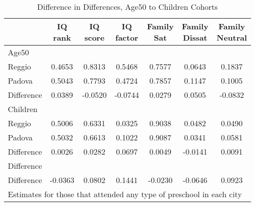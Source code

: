 \begin{table}[htbp]\centering
\caption{Difference in Differences, Age50 to Children Cohorts}
\begin{tabular}{l*{6}{c}}
\hline\hline
            &     IQ rank&    IQ score&   IQ factor&  Family Sat&Family Dissat&Family Neutral\\
\hline
Age50       &            &            &            &            &            &            \\
Reggio      &      0.4653&      0.8313&      0.5468&      0.7577&      0.0643&      0.1837\\
Padova      &      0.5043&      0.7793&      0.4724&      0.7857&      0.1147&      0.1005\\
Difference  &      0.0389&     -0.0520&     -0.0744&      0.0279&      0.0505&     -0.0832\\
\hline
Children    &            &            &            &            &            &            \\
Reggio      &      0.5006&      0.6331&      0.0325&      0.9038&      0.0482&      0.0490\\
Padova      &      0.5032&      0.6613&      0.1022&      0.9087&      0.0341&      0.0581\\
Difference  &      0.0026&      0.0282&      0.0697&      0.0049&     -0.0141&      0.0091\\
\hline
Difference  &            &            &            &            &            &            \\
Difference  &     -0.0363&      0.0802&      0.1441&     -0.0230&     -0.0646&      0.0923\\
\hline\hline
\multicolumn{7}{l}{\footnotesize Estimates for those that attended any type of preschool in each city}\\
\end{tabular}
\end{table}
